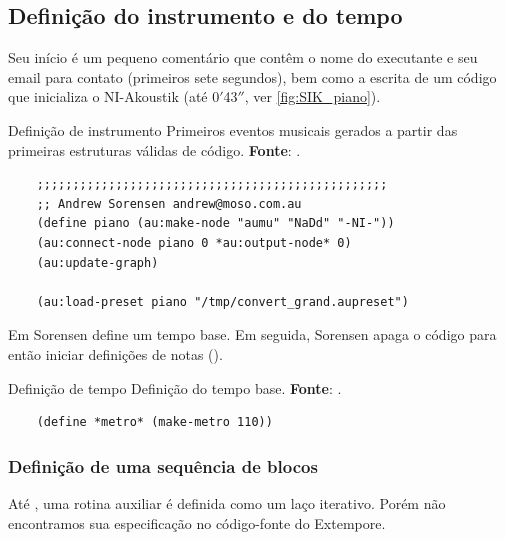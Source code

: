 \subsection{Definição do instrumento e do tempo}\label{sec:define_instr}

Seu início é um pequeno comentário que contêm o nome do executante e seu email para contato (primeiros sete segundos), bem como a escrita de um código que inicializa o NI-Akoustik (até 0$'$43$''$, ver \autoref{fig:SIK_piano}). 

\begin{example}{Definição de instrumento}
  \centering 
Primeiros eventos musicais gerados a partir das primeiras estruturas válidas de código. \textbf{Fonte}: \cite{sorensen_youtube_2014}.
  \begin{verbatim}
    ;;;;;;;;;;;;;;;;;;;;;;;;;;;;;;;;;;;;;;;;;;;;;;;;;
    ;; Andrew Sorensen andrew@moso.com.au
    (define piano (au:make-node "aumu" "NaDd" "-NI-"))
    (au:connect-node piano 0 *au:output-node* 0)
    (au:update-graph)

    (au:load-preset piano "/tmp/convert_grand.aupreset")
  \end{verbatim}
  \label{fig:SIK_piano}
\end{example}


Em  Sorensen define um tempo base. Em seguida, Sorensen apaga o código para então iniciar definições de notas ().

\begin{example}{Definição de tempo}\label{ex:def_tempo}
  \centering
  Definição do tempo base. \textbf{Fonte}: \cite{sorensen_youtube_2014}.
  \begin{verbatim}
    (define *metro* (make-metro 110))
  \end{verbatim}
  
\end{example}

\subsubsection{Definição de uma sequência de blocos}

Até , uma rotina auxiliar é definida como um laço iterativo. Porém não encontramos sua especificação no código-fonte do Extempore.

